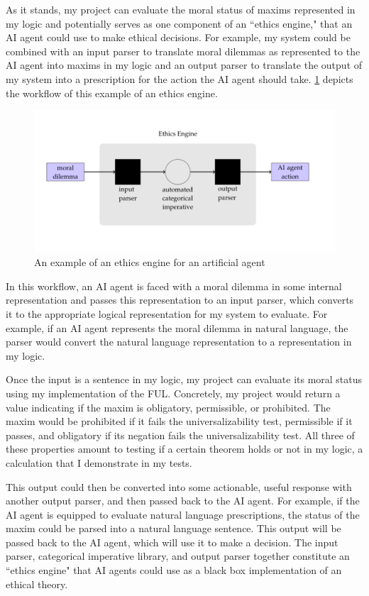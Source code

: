 \begin{isabellebody}
\begin{isamarkuptext}
As it stands, my project can evaluate the moral status of maxims represented in my logic and potentially 
serves as one component of an ``ethics engine," that an AI agent could use to make ethical decisions.
For example, my system could be combined with an input parser to translate moral dilemmas as represented to the AI agent into maxims in my logic and an output 
parser to translate the output of my system into a prescription for the action the AI agent should take.
\ref{fig:AIengine} depicts the workflow of this example of an ethics engine.%
\end{isamarkuptext}\isamarkuptrue%
%
\begin{figure}
\centering
\includegraphics[scale=0.4]{AI_engine.png}
\caption{An example of an ethics engine for an artificial agent} \label{fig:AIengine}
\end{figure}
%
\begin{isamarkuptext}%
In this workflow, an AI agent is faced with a moral dilemma in some internal representation and 
passes this representation to an input parser, which converts it to the appropriate logical representation 
for my system to evaluate. For example, if an AI agent represents the moral dilemma in natural language, 
the parser would convert the natural language representation to a representation in my logic.

Once the
input is a sentence in my logic, my project can evaluate its moral status using my implementation of 
the FUL. Concretely, my project would return a value indicating if the maxim is obligatory, permissible, 
or prohibited. The maxim would be prohibited if it fails the universalizability test, permissible if it passes, and obligatory 
if its negation fails the universalizability test. All three of these properties amount to testing if a 
certain theorem holds or not in my logic, a calculation that I demonstrate in my tests. 

This output could then be converted into some actionable, useful response with another output parser, 
and then passed back to the AI agent. For example, if the AI agent is equipped to evaluate natural language prescriptions, the 
status of the maxim could be parsed into a natural language sentence. This output will be passed back 
to the AI agent, which will use it to make a decision. The input parser, categorical imperative library, 
and output parser together constitute an ``ethics engine" that AI agents could use as a black box 
implementation of an ethical theory. 


\end{isamarkuptext}
\end{isabellebody}
